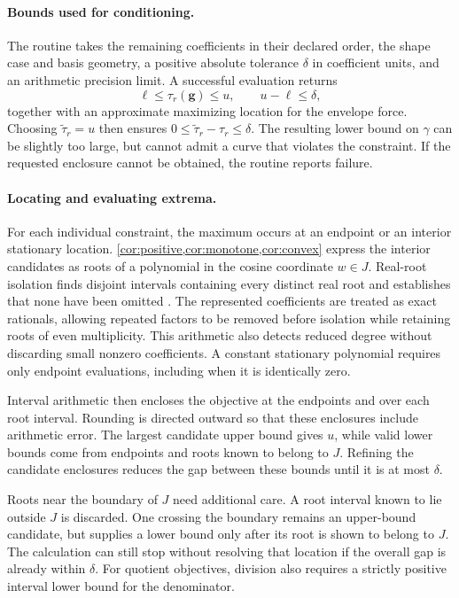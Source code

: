 \paragraph{Bounds used for conditioning.}
The routine takes the remaining coefficients in their declared order,
the shape case and basis geometry, a positive absolute tolerance
$\delta$ in coefficient units, and an arithmetic precision limit.
A successful evaluation returns
\[
 \ell\leq\tau_r(\boldsymbol g)\leq u,
 \qquad u-\ell\leq\delta,
\]
together with an approximate maximizing location for the envelope
force. Choosing $\widetilde\tau_r=u$ then ensures
$0\leq\widetilde\tau_r-\tau_r\leq\delta$. The resulting lower bound on
$\gamma$ can be slightly too large, but cannot admit a curve that
violates the constraint. If the requested enclosure cannot be
obtained, the routine reports failure.

\paragraph{Locating and evaluating extrema.}
For each individual constraint, the maximum occurs at an endpoint
or an interior stationary location.
\cref{cor:positive,cor:monotone,cor:convex} express the interior
candidates as roots of a polynomial in the cosine coordinate $w\in J$.
Real-root isolation finds disjoint intervals containing every
distinct real root and establishes that none have been omitted
\citep{johansson2017arb}. The represented coefficients are treated as
exact rationals, allowing repeated factors to be removed before
isolation while retaining roots of even multiplicity. This arithmetic
also detects reduced degree without discarding small nonzero
coefficients. A constant stationary polynomial requires only endpoint
evaluations, including when it is identically zero.

Interval arithmetic then encloses the objective at the endpoints
and over each root interval. Rounding is directed outward so that
these enclosures include arithmetic error. The largest candidate
upper bound gives $u$, while valid lower bounds come from endpoints
and roots known to belong to $J$. Refining the candidate enclosures
reduces the gap between these bounds until it is at most $\delta$.

Roots near the boundary of $J$ need additional care. A root interval
known to lie outside $J$ is discarded. One crossing the boundary
remains an upper-bound candidate, but supplies a lower bound only
after its root is shown to belong to $J$. The calculation can still
stop without resolving that location if the overall gap is already
within $\delta$. For quotient objectives, division also requires a
strictly positive interval lower bound for the denominator.

